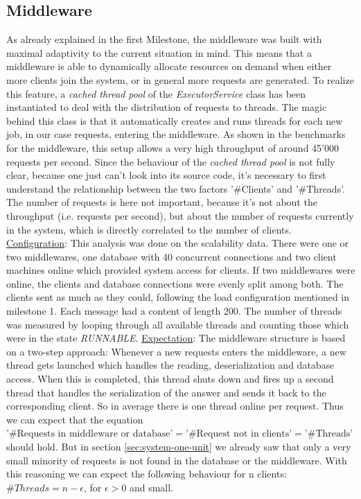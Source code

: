 \documentclass[11pt]{article}
\begin{document}
\subsection{Middleware}\label{sec:mw}
As already explained in the first Milestone, the middleware was built with maximal adaptivity to the current situation in mind. This means that a middleware is able to dynamically allocate resources on demand when either more clients join the system, or in general more requests are generated. To realize this feature, a \textit{cached thread pool} of the \textit{ExecutorService} class has been instantiated to deal with the distribution of requests to threads. The magic behind this class is that it automatically creates and runs threads for each new job, in our case requests, entering the middleware. As shown in the benchmarks for the middleware, this setup allows a very high throughput of around 45'000 requests per second. Since the behaviour of the \textit{cached thread pool} is not fully clear, because one just can't look into its source code, it's necessary to first understand the relationship between the two factors '\#Clients' and '\#Threads'. The number of requests is here not important, because it's not about the throughput (i.e. requests per second), but about the number of requests currently in the system, which is directly correlated to the number of clients.
\newline\underline{Configuration}: This analysis was done on the scalability data. There were one or two middlewares, one database with 40 concurrent connections and two client machines online which provided system access for clients. If two middlewares were online, the clients and database connections were evenly split among both. The clients sent as much as they could, following the load configuration mentioned in milestone 1. Each message had a content of length 200. The number of threads was measured by looping through all available threads and counting those which were in the state \textit{RUNNABLE}.
\newline\underline{Expectation}: The middleware structure is based on a two-step approach: Whenever a new requests enters the middleware, a new thread gets launched which handles the reading, deserialization and database access. When this is completed, this thread shuts down and fires up a second thread that handles the serialization of the answer and sends it back to the corresponding client. So in average there is one thread online per request. Thus we can expect that the equation $\text{'\#Requests in middleware or database'}=\text{'\#Request not in clients'}=\text{'\#Threads'}$ should hold. But in section \ref{sec:system-one-unit} we already saw that only a very small minority of requests is not found in the database or the middleware. With this reasoning we can expect the following behaviour for n clients: $\#Threads=n-\epsilon$, for $\epsilon>0$ and small.
\end{document}
